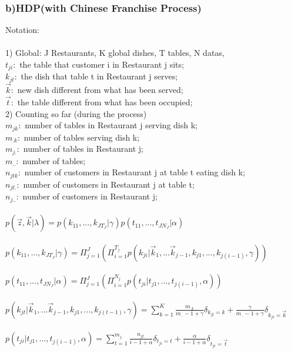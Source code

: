\documentclass{article}
\begin{document}
\begin{spacing}{1.1}
\subsubsection*{b)HDP(with Chinese Franchise Process)}
Notation:\\ \\
1) Global: J Restaurants, K global dishes, T tables, N datas,\\
$t_{ji}:$ the table that customer i in Restaurant j sits;\\
$k_{jt}:$ the dish that table t in Restaurant j serves;\\
$\vec k:$ new dish different from what has been served;\\
$\vec t:$ the table different from what has been occupied;\\
2) Counting so far (during the process)\\
$m_{jk}:$ number of tables in Restaurant j serving dish k;\\
$m_{.k}:$ number of tables serving dish k;\\
$m_{j.}:$ number of tables in Restaurant j;\\
$m_{..}:$ number of tables;\\
$n_{jtk}:$ number of customers in Restaurant j at table t eating dish k;\\
$n_{jt.}:$ number of customers in Restaurant j at table t;\\
$n_{j..}:$ number of customers in Restaurant j;\\ \\
$p(\vec z,\vec k|\lambda)=p(k_{11},...,k_{JT_{J}}|\gamma)p(t_{11},...,t_{JN_{J}}|\alpha)$\\ \\
$p(k_{11},...,k_{JT_{J}}|\gamma)=\Pi_{j=1}^{J}(\Pi_{i=1}^{T_{j}}p(k_{ji}|\vec k_{1},...\vec k_{j-1},k_{j1},...,k_{j(i-1)},\gamma))$\\ \\
$p(t_{11},...,t_{JN_{J}}|\alpha)=\Pi_{j=1}^{J}(\Pi_{i=1}^{N_{j}}p(t_{ji}|t_{j1},...,t_{j(i-1)},\alpha))$\\ \\
$p(k_{jt}|\vec k_{1},...\vec k_{j-1},k_{j1},...,k_{j(t-1)},\gamma)=\sum_{k=1}^{K}\frac{m_{.k}}{m_{..}-1+\gamma}\delta_{k_{jt}=k}+\frac{\gamma}{m_{..}-1+\gamma}\delta_{k_{ji}=\vec k}$\\ \\
$p(t_{ji}|t_{j1},...,t_{j(i-1)},\alpha)=\sum_{t=1}^{m_{j.}}\frac{n_{jt.}}{i-1+\alpha}\delta_{t_{ji}=t}+\frac{\alpha}{i-1+\alpha}\delta_{t_{ji}=\vec t}$\\ \\


\end{spacing}
\end{document}
